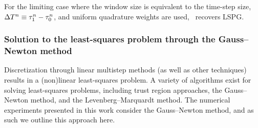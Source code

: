 \begin{remark}
For the limiting case where the window size is equivalent to the time-step size, $\Delta T^{n} \equiv \tau^{n}_{1} - \tau^{n}_{0}$, and uniform 
quadrature weights are used, \methodAcronym\ recovers LSPG.
\end{remark} 
\subsubsection{Solution to the least-squares problem through the Gauss--Newton method}
Discretization through linear multistep methods (as well as other techniques) 
results in a (non)linear least-squares problem.
A variety of algorithms exist for solving least-squares problems, including trust region approaches, the Gauss–Newton method, and the Levenberg–Marquardt method.  
The numerical experiments presented in this work consider the Gauss--Newton method, and as such we outline this approach here. 

